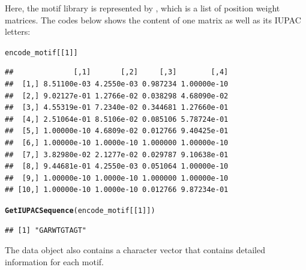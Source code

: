 \documentclass[a4paper,10pt]{article}\usepackage[]{graphicx}\usepackage[]{color}
\makeatletter
\newcommand{\hlnum}[1]{\textcolor[rgb]{0.686,0.059,0.569}{#1}}%
\newcommand{\hlstd}[1]{\textcolor[rgb]{0.345,0.345,0.345}{#1}}%
\newcommand{\hlkwd}[1]{\textcolor[rgb]{0.737,0.353,0.396}{\textbf{#1}}}%
\newenvironment{kframe}{%
 \def\at@end@of@kframe{}%
 \ifinner\ifhmode%
  \def\at@end@of@kframe{\end{minipage}}%
  \begin{minipage}{\columnwidth}%
 \fi\fi%
 \def\FrameCommand##1{\hskip\@totalleftmargin \hskip-\fboxsep
 \colorbox{shadecolor}{##1}\hskip-\fboxsep
     \hskip-\linewidth \hskip-\@totalleftmargin \hskip\columnwidth}%
 \MakeFramed {\advance\hsize-\width
   \@totalleftmargin\z@ \linewidth\hsize
   \@setminipage}}%
 {\par\unskip\endMakeFramed%
 \at@end@of@kframe}
\newenvironment{knitrout}{}{} %
\makeatother
\begin{document}
Here, the motif library is represented by ,
which is a list of position weight matrices. The codes below shows the
content of one matrix as well as its IUPAC letters:

\begin{knitrout}
\color{fgcolor}\begin{kframe}
\begin{alltt}
\hlstd{encode_motif[[}\hlnum{1}\hlstd{]]}
\end{alltt}
\begin{verbatim}
##              [,1]       [,2]     [,3]        [,4]
##  [1,] 8.51100e-03 4.2550e-03 0.987234 1.00000e-10
##  [2,] 9.02127e-01 1.2766e-02 0.038298 4.68090e-02
##  [3,] 4.55319e-01 7.2340e-02 0.344681 1.27660e-01
##  [4,] 2.51064e-01 8.5106e-02 0.085106 5.78724e-01
##  [5,] 1.00000e-10 4.6809e-02 0.012766 9.40425e-01
##  [6,] 1.00000e-10 1.0000e-10 1.000000 1.00000e-10
##  [7,] 3.82980e-02 2.1277e-02 0.029787 9.10638e-01
##  [8,] 9.44681e-01 4.2550e-03 0.051064 1.00000e-10
##  [9,] 1.00000e-10 1.0000e-10 1.000000 1.00000e-10
## [10,] 1.00000e-10 1.0000e-10 0.012766 9.87234e-01
\end{verbatim}
\begin{alltt}
\hlkwd{GetIUPACSequence}\hlstd{(encode_motif[[}\hlnum{1}\hlstd{]])}
\end{alltt}
\begin{verbatim}
## [1] "GARWTGTAGT"
\end{verbatim}
\end{kframe}
\end{knitrout}

The data object  also contains a character vector  that contains detailed information for each motif.
\end{document}
